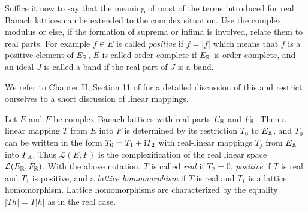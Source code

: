 Suffice it now to say that the meaning of most of the terms introduced for real Banach lattices can be extended to the complex situation.
Use the complex modulus or else, if the formation of suprema or infima is involved, relate them to real parts.
For example $ f \in E $ is called \emph{positive} if\/ $ f = |f| $ which means that $ f $ is a positive element of\/ $ E_{\mathbb{R}} $, $ E $ is called order complete if\/ $ E_{\mathbb{R}} $ is order complete, and an ideal $ J $ is called a band if the real part of\/ $ J $ is a band.

We refer to Chapter II, Section 11 of \textcite{schaefer:1974} for a detailed discussion of this and restrict ourselves to a short discussion of linear mappings.

Let $ E $ and $ F $ be complex Banach lattices with real parts $ E_{\mathbb{R}} $ and $ F_{\mathbb{R}} $.
Then a linear mapping $ T $ from $ E $ into $ F $ is determined by its restriction $ T_{0} $ to $ E_{\mathbb{R}} $, and $ T_{0} $ can be written in the form $ T_{0} = T_{1} + \mathrm{i} T_{2} $ with real-linear mappings $ T_{j} $ from $ E_{\mathbb{R}} $ into $ F_{\mathbb{R}} $.
Thus $ \mathcal{L}(E,F) $ is the complexification of the real linear space $ \mathcal{L}(E_{\mathbb{R}},F_{\mathbb{R}}) $.
With the above notation, $ T $ is called \emph{real} if\/ $ T_{2} = 0 $, \emph{positive} if\/ $ T $ is real and $ T_{1} $ is positive, and a \emph{lattice homomorphism} if\/ $ T $ is real and $ T_{1} $ is a lattice homomorphism.
Lattice homomorphisms are characterized by the equality $ |Th| = T|h| $ as in the real case.
